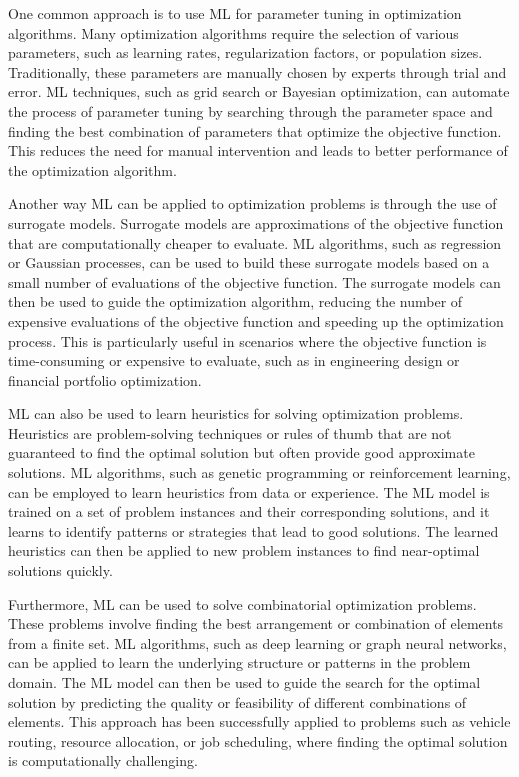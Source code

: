 One common approach is to use ML for parameter tuning in optimization algorithms. Many optimization algorithms require the selection of various parameters, such as learning rates, regularization factors, or population sizes. Traditionally, these parameters are manually chosen by experts through trial and error. ML techniques, such as grid search or Bayesian optimization, can automate the process of parameter tuning by searching through the parameter space and finding the best combination of parameters that optimize the objective function. This reduces the need for manual intervention and leads to better performance of the optimization algorithm.

Another way ML can be applied to optimization problems is through the use of surrogate models. Surrogate models are approximations of the objective function that are computationally cheaper to evaluate. ML algorithms, such as regression or Gaussian processes, can be used to build these surrogate models based on a small number of evaluations of the objective function. The surrogate models can then be used to guide the optimization algorithm, reducing the number of expensive evaluations of the objective function and speeding up the optimization process. This is particularly useful in scenarios where the objective function is time-consuming or expensive to evaluate, such as in engineering design or financial portfolio optimization.

ML can also be used to learn heuristics for solving optimization problems. Heuristics are problem-solving techniques or rules of thumb that are not guaranteed to find the optimal solution but often provide good approximate solutions. ML algorithms, such as genetic programming or reinforcement learning, can be employed to learn heuristics from data or experience. The ML model is trained on a set of problem instances and their corresponding solutions, and it learns to identify patterns or strategies that lead to good solutions. The learned heuristics can then be applied to new problem instances to find near-optimal solutions quickly.

Furthermore, ML can be used to solve combinatorial optimization problems. These problems involve finding the best arrangement or combination of elements from a finite set. ML algorithms, such as deep learning or graph neural networks, can be applied to learn the underlying structure or patterns in the problem domain. The ML model can then be used to guide the search for the optimal solution by predicting the quality or feasibility of different combinations of elements. This approach has been successfully applied to problems such as vehicle routing, resource allocation, or job scheduling, where finding the optimal solution is computationally challenging.

